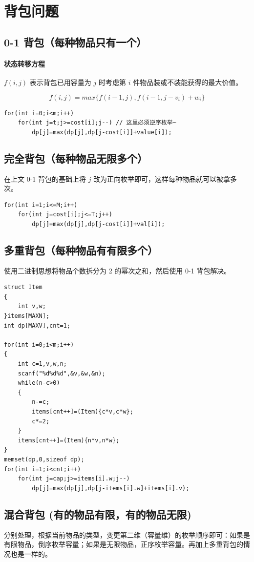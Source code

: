 \section{背包问题}

\subsection{0-1 背包（每种物品只有一个）}
\paragraph{状态转移方程} $f(i, j)$ 表示背包已用容量为 $j$ 时考虑第 $i$ 件物品装或不装能获得的最大价值。

$$f(i, j) = max\{f(i-1, j), f(i-1, j - v_i) +w_i\}$$

\begin{verbatim}
for(int i=0;i<m;i++)
    for(int j=t;j>=cost[i];j--) // 这里必须逆序枚举~
        dp[j]=max(dp[j],dp[j-cost[i]]+value[i]);
\end{verbatim}

\subsection{完全背包（每种物品无限多个）}
在上文 0-1 背包的基础上将 $j$ 改为正向枚举即可，这样每种物品就可以被拿多次。
\begin{verbatim}
for(int i=1;i<=M;i++)
    for(int j=cost[i];j<=T;j++)
        dp[j]=max(dp[j],dp[j-cost[i]]+val[i]);
\end{verbatim}

\subsection{多重背包（每种物品有有限多个）}
使用二进制思想将物品个数拆分为 2 的幂次之和，然后使用 0-1 背包解决。
\begin{verbatim}
struct Item
{
    int v,w;
}items[MAXN];
int dp[MAXV],cnt=1;

for(int i=0;i<m;i++)
{
    int c=1,v,w,n;
    scanf("%d%d%d",&v,&w,&n);
    while(n-c>0)
    {
        n-=c;
        items[cnt++]=(Item){c*v,c*w};
        c*=2;
    }
    items[cnt++]=(Item){n*v,n*w};
}
memset(dp,0,sizeof dp);
for(int i=1;i<cnt;i++)
    for(int j=cap;j>=items[i].w;j--)
        dp[j]=max(dp[j],dp[j-items[i].w]+items[i].v);
\end{verbatim}

\subsection{混合背包 (有的物品有限，有的物品无限)}
分别处理，根据当前物品的类型，变更第二维（容量维）的枚举顺序即可：如果是有限物品，倒序枚举容量；如果是无限物品，正序枚举容量。再加上多重背包的情况也是一样的。

